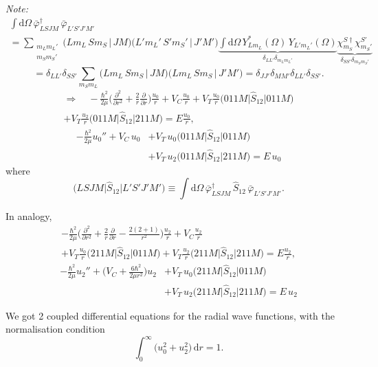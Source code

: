 \documentclass[11pt,a4paper]{article}
\newcommand{\op}[1]{\hat{#1}}
\newcommand{\ud}{\mathrm{d}}
\begin{document}
\emph{Note:}
\begin{multline*}
\int\!\ud\Omega\,\bar\varphi^\dagger_{LSJM}\,\bar\varphi_{L'S'J'M'}\\
=\sum_{\substack{m_Lm_L'\\ m_Sm_S'}}\big(Lm_L\,Sm_S\,|\,JM\big)\big(L'm_L'\,S'm_S'\,|\,J'M'\big)
\underbrace{\int\!\ud\Omega\,Y^*_{Lm_L}(\Omega)\,Y_{L'm_L'}(\Omega)}_{\delta_{LL'}\delta_{m_Lm_L'}}
\underbrace{\chi^{S\dagger}_{m_S}\chi^{S'}_{m_S'}}_{\delta_{SS'}\delta_{m_Sm_S'}}
\end{multline*}
\[
=\delta_{LL'}\delta_{SS'}\sum_{m_Sm_L}\big(Lm_L\,Sm_S\,|\,JM\big)\big(Lm_L\,Sm_S\,|\,J'M'\big)
=\delta_{JJ'}\delta_{MM'}\delta_{LL'}\delta_{SS'} .
\]
\begin{multline*}
\Rightarrow\quad
-\frac{\hbar^2}{2\mu}\Big(\frac{\partial^2}{\partial r^2}+\frac2r\frac{\partial}{\partial r}\Big)\frac{u_0}{r}
+V_C\frac{u_0}{r}+V_T\frac{u_0}{r}\big(011M\big|\op S_{12}\big|011M\big)\\
+V_T\frac{u_2}{r}\big(011M\big|\op S_{12}\big|211M\big)=E\frac{u_0}{r},
\end{multline*}
\[
\boxed{
\begin{aligned}
-\frac{\hbar^2}{2\mu}u_0''+V_C\,u_0
&+V_T\,u_0\big(011M\big|\op S_{12}\big|011M\big)\\
&+V_T\,u_2\big(011M\big|\op S_{12}\big|211M\big)=E\,u_0
\end{aligned}
}
\]
where
\[
\big(LSJM\big|\op S_{12}\big|L'S'J'M'\big)\equiv\int\!\ud\Omega\,\bar\varphi^\dagger_{LSJM}\,\op S_{12}\,\bar\varphi_{L'S'J'M'} .
\]

In analogy,
\begin{multline*}
-\frac{\hbar^2}{2\mu}\Big(\frac{\partial^2}{\partial r^2}+\frac2r\frac{\partial}{\partial r}
-\frac{2(2+1)}{r^2}\Big)\frac{u_2}{r}+V_C\frac{u_2}{r}\\
+V_T\frac{u_0}{r}\big(211M\big|\op S_{12}\big|011M\big)
+V_T\frac{u_2}{r}\big(211M\big|\op S_{12}\big|211M\big)=E\frac{u_2}{r},
\end{multline*}
\[
\boxed{
\begin{aligned}
-\frac{\hbar^2}{2\mu}u_2''+\Big(V_C+\frac{6\hbar^2}{2\mu r^2}\Big)u_2
&+V_T\,u_0\big(211M\big|\op S_{12}\big|011M\big)\\
&+V_T\,u_2\big(211M\big|\op S_{12}\big|211M\big)=E\,u_2
\end{aligned}
}
\]

We got 2 coupled differential equations for the radial wave functions, with the
normalisation condition
\[
\int_0^\infty\big(u_0^2+u_2^2\big)\,\ud r=1 .
\]
\end{document}
